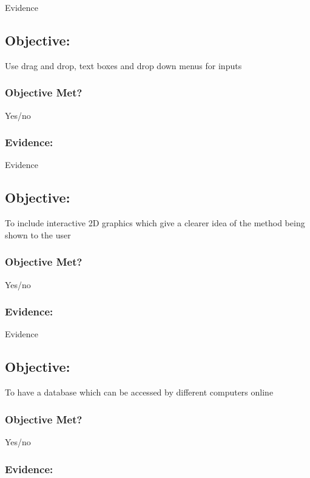 Evidence

\subsection{Objective: }

Use drag and drop, text boxes and drop down menus for inputs

\subsubsection{Objective Met?}

Yes/no 

\subsubsection{Evidence: }

Evidence

\subsection{Objective: }

To include interactive 2D graphics which give a clearer idea of the method being shown to the user

\subsubsection{Objective Met?}

Yes/no 

\subsubsection{Evidence: }

Evidence

\subsection{Objective: }

To have a database which can be accessed by different computers online

\subsubsection{Objective Met?}

Yes/no 

\subsubsection{Evidence: }

